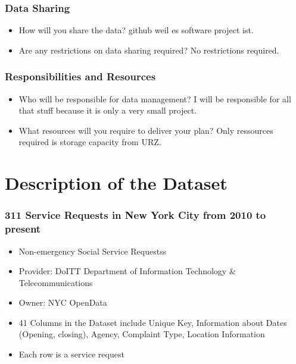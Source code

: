 \documentclass{beamer}
\begin{document}
\begin{frame}
\frametitle{Data Sharing}
\begin{itemize}
\item How will you share the data?
github weil es software project ist.
\vfill
\item Are any restrictions on data sharing required?
No restrictions required.
\end{itemize}
\end{frame}
\begin{frame}
\frametitle{Responsibilities and Resources}
\begin{itemize}
\item Who will be responsible for data management?
I will be responsible for all that stuff because it is only a very small project.
\vfill
\item What resources will you require to deliver your plan?
Only ressources required is storage capacity from URZ.
\end{itemize}
\end{frame}
\section{Description of the Dataset}
\begin{frame}
\frametitle{311 Service Requests in New York City from 2010 to present}
\begin{itemize}
\item Non-emergency Social Service Requestss
\item Provider: DoITT Department of Information Technology \& Telecommunications
\item Owner: NYC OpenData
\item 41 Columns in the Dataset include Unique Key, Information about Dates (Opening, closing), Agency, Complaint Type, Location Information
\item Each row is a service request
\end{itemize}
\end{frame}
\end{document}
